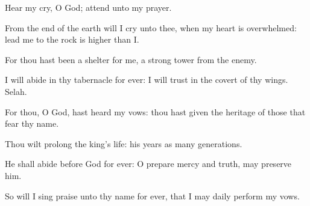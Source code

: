 {\Q {}Hear my
cry, O
God;
attend unto my
prayer.


\par }{\Q {}From the
end of the
earth will I
cry unto thee, when my
heart is
overwhelmed:
lead me to the
rock
{} is
higher than I.


\par }{\Q {}For thou hast been a
shelter for me,
{} a
strong
tower
from the
enemy.


\par }{\Q {}I will
abide in thy
tabernacle for
ever: I will
trust in the
covert of thy
wings.
Selah.


\par }{\BB \par }
{\Q {}For thou, O
God, hast
heard my
vows: thou hast
given
{} the
heritage of those that
fear thy
name.


\par }{\Q {}Thou wilt
prolong the
king’s
life:
{} his
years as
many
generations.


\par }{\Q {}He shall
abide
before
God for
ever: O
prepare
mercy and
truth,
{} may
preserve him.


\par }{\Q {}So will I
sing praise unto thy
name for
ever, that I may
daily
perform my
vows.




\par }
